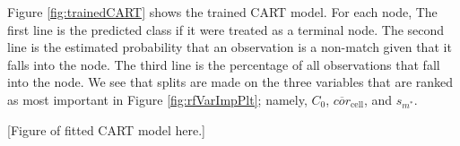 \documentclass[11pt,]{isuthesis}
\begin{document}
Figure \ref{fig:trainedCART} shows the trained CART model.
For each node, The first line is the predicted class if it were treated as a terminal node.
The second line is the estimated probability that an observation is a non-match given that it falls into the node.
The third line is the percentage of all observations that fall into the node.
We see that splits are made on the three variables that are ranked as most important in Figure \ref{fig:rfVarImpPlt}; namely, \(C_0\), \(\overline{cor}_{\text{cell}}\), and \(s_{m^*}\).

{[}Figure of fitted CART model here.{]}

\renewcommand\bibname{\centerline{REFERENCES}}
\unappendixtitle
\newpage
{}
{}

\end{document}
